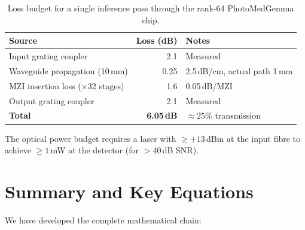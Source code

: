 \documentclass[12pt, a4paper]{article}
\begin{document}
\begin{table}[H]
\centering
\caption{Loss budget for a single inference pass through the rank-64
  PhotoMedGemma chip.}
\begin{tabular}{lrl}
\toprule
\textbf{Source} & \textbf{Loss (dB)} & \textbf{Notes} \\
\midrule
Input grating coupler & 2.1 & Measured \\
Waveguide propagation (10\,mm) & 0.25 & 2.5\,dB/cm, actual path 1\,mm \\
MZI insertion loss ($\times$32 stages) & 1.6 & 0.05\,dB/MZI \\
Output grating coupler & 2.1 & Measured \\
\midrule
\textbf{Total} & \textbf{6.05\,dB} & $\approx 25\%$ transmission \\
\bottomrule
\end{tabular}
\end{table}

The optical power budget requires a laser with $\geq +13$\,dBm at the input
fibre to achieve $\geq 1$\,mW at the detector (for $>40$\,dB SNR).

\section{Summary and Key Equations}
\label{sec:summary}

We have developed the complete mathematical chain:
\end{document}
